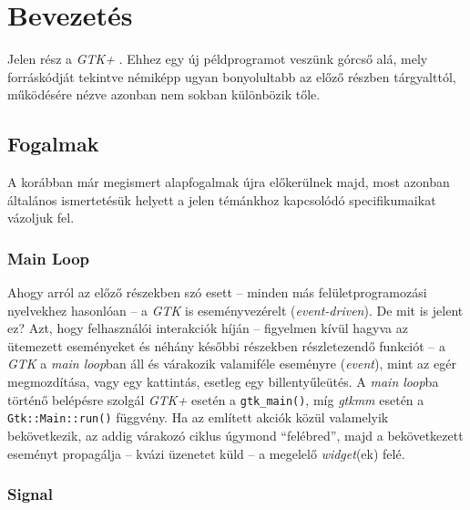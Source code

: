 \section{Bevezetés}

Jelen rész a \textit{GTK+} . Ehhez egy új példprogramot veszünk górcső alá, mely forráskódját tekintve némiképp ugyan bonyolultabb az előző részben tárgyalttól, működésére nézve azonban nem sokban különbözik tőle.

\subsection{Fogalmak}

A korábban már megismert alapfogalmak újra előkerülnek majd, most azonban általános ismertetésük helyett a jelen témánkhoz kapcsolódó specifikumaikat vázoljuk fel.

\subsubsection{Main Loop}

Ahogy arról az előző részekben szó esett -- minden más felületprogramozási nyelvekhez hasonlóan -- a \textit{GTK} is eseményvezérelt (\textit{event-driven}). De mit is jelent ez?  Azt, hogy felhasználói interakciók híján -- figyelmen kívül hagyva az ütemezett eseményeket és néhány későbbi részekben részletezendő funkciót -- a \textit{GTK} a \textit{main loop}ban áll és várakozik valamiféle eseményre (\textit{event}), mint az egér megmozdítása, vagy egy kattintás, esetleg egy billentyűleütés. A \textit{main loop}ba történő belépésre szolgál \textit{GTK+} esetén a \texttt{gtk\_main()}, míg \textit{gtkmm} esetén a \texttt{Gtk::Main::run()} függvény. Ha az említett akciók közül valamelyik bekövetkezik, az addig várakozó ciklus úgymond ``felébred'', majd a bekövetkezett eseményt propagálja -- kvázi üzenetet küld -- a megelelő \textit{widget}(ek) felé.

\subsubsection{Signal}

